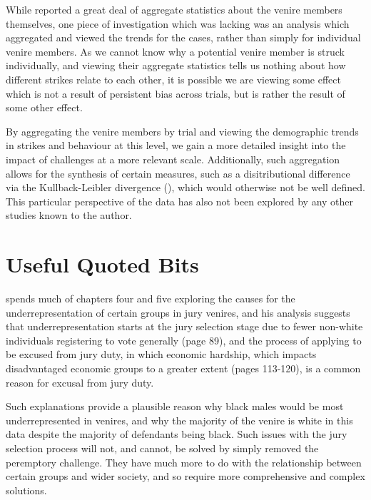 While \cite{JurySunshineProj} reported a great deal of aggregate statistics about the venire members themselves, one piece of
investigation which was lacking was an analysis which aggregated and viewed the trends for the cases, rather than simply for
individual venire members. As we cannot know why a potential venire member is struck individually, and viewing their aggregate
statistics tells us nothing about how different strikes relate to each other, it is possible we are viewing some effect which is
not a result of persistent bias across trials, but is rather the result of some other effect.

By aggregating the venire members by trial and viewing the demographic trends in strikes and behaviour at this level, we gain a
more detailed insight into the impact of challenges at a more relevant scale. Additionally, such aggregation allows for the
synthesis of certain measures, such as a disitributional difference via the Kullback-Leibler divergence (\cite{kullback1951}),
which would otherwise not be well defined. This particular perspective of the data has also not been explored by any other studies
known to the author.

\section{Useful Quoted Bits}

\cite{vandykejurysel} spends much of chapters four and five exploring the causes for the underrepresentation of certain groups in
jury venires, and his analysis suggests that underrepresentation starts at the jury selection stage due to fewer non-white
individuals registering to vote generally (page 89), and the process of applying to be excused from jury duty, in which economic
hardship, which impacts disadvantaged economic groups to a greater extent (pages 113-120), is a common reason for excusal from
jury duty.

Such explanations provide a plausible reason why black males would be most underrepresented in venires, and why the majority of
the venire is white in this data despite the majority of defendants being black. Such issues with the jury selection process will
not, and cannot, be solved by simply removed the peremptory challenge. They have much more to do with the relationship between
certain groups and wider society, and so require more comprehensive and complex solutions.